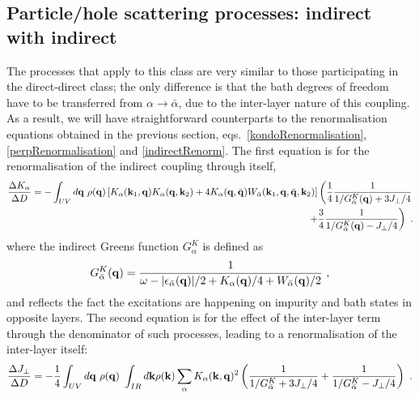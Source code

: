 \subsection{Particle/hole scattering processes: indirect with indirect}
The processes that apply to this class are very similar to those participating in the direct-direct class; the only difference is that the bath degrees of freedom have to be transferred from \(\alpha \to \bar\alpha\), due to the inter-layer nature of this coupling. As a result, we will have straightforward counterparts to the renormalisation equations obtained in the previous section, eqs.~\ref{kondoRenormalisation}, \ref{perpRenormalisation} and \ref{indirectRenorm}. The first equation is for the renormalisation of the indirect coupling through itself,
\begin{equation}\begin{aligned}
	\frac{\Delta K_\alpha}{\Delta D} = -\int_{UV} d{\bf q} ~\rho({\bf q}) \left[K_\alpha({\bf k}_1, {\bf q})K_\alpha({\bf q}, {\bf k}_2) + 4K_\alpha({\bf q}, \bar {\bf q})W_{\bar\alpha}({\bf k}_1, {\bf q}, \bar {\bf q}, {\bf k}_2)\right]\left(\frac{1}{4}\frac{1}{1/ G_{\bar\alpha}^K({\bf q}) + 3J_\perp/4}\right.\\
	\left. + \frac{3}{4}\frac{1}{1/ G_{\bar\alpha}^K({\bf q}) - J_\perp/4}\right)~.
\end{aligned}\end{equation}
where the indirect Greens function \( G^K_\alpha\) is defined as
\begin{equation}\begin{aligned}
	G_{\bar\alpha}^K({\bf q}) = \frac{1}{\omega - |\epsilon_{\bar\alpha}({\bf q})| / 2 + K_\alpha({\bf q}) / 4 + W_{\bar\alpha}({\bf q}) / 2}~,
\end{aligned}\end{equation}
and reflects the fact the excitations are happening on impurity and bath states in opposite layers. The second equation is for the effect of the inter-layer term through the denominator of such processes, leading to a renormalisation of the inter-layer itself:
\begin{equation}\begin{aligned}
	\frac{\Delta J_\perp}{\Delta D} = -\frac{1}{4}\int_{UV} d{\bf q} ~\rho({\bf q})~\int_{IR} d{\bf k} \rho({\bf k}) \sum_\alpha K_\alpha({\bf k}, {\bf q})^2\left(\frac{1}{1/ G_{\bar\alpha}^K + 3J_\perp/4} + \frac{1}{1/ G_{\bar\alpha}^K - J_\perp/4}\right)~.
\end{aligned}\end{equation}
